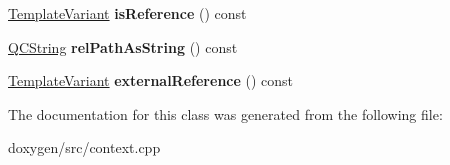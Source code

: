 \begin{DoxyCompactItemize}
\mbox{\hyperlink{class_template_variant}{Template\+Variant}} {\bfseries is\+Reference} () const
\item 
\mbox{\label{class_nav_path_elem_context_1_1_private_ae2dfa9aee9dba4921ea949ce37210bad}} 
\mbox{\hyperlink{class_q_c_string}{Q\+C\+String}} {\bfseries rel\+Path\+As\+String} () const
\item 
\mbox{\label{class_nav_path_elem_context_1_1_private_a8662b907d8cbe88871683f2674ee8638}} 
\mbox{\hyperlink{class_template_variant}{Template\+Variant}} {\bfseries external\+Reference} () const
\end{DoxyCompactItemize}


The documentation for this class was generated from the following file\+:\begin{DoxyCompactItemize}
\item 
doxygen/src/context.\+cpp\end{DoxyCompactItemize}
